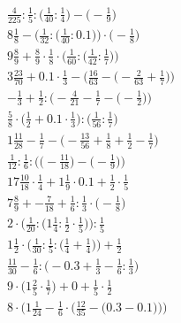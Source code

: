 \documentclass[8pt]{article}
\begin{document}
\begin{align}
\frac{4}{225} : \frac{1}{5} : \big(\frac{1}{40} : \frac{1}{4}\big) - \big(-\frac{1}{9}\big) \\
8\frac{1}{8} - \Big(\frac{1}{32} : \big(\frac{1}{40} : 0.1\big)\Big) \cdot \Big(-\frac{1}{8}\Big) \\
9\frac{8}{9} + \frac{8}{9} \cdot \frac{1}{8} \cdot \Big(\frac{1}{60} : \big(\frac{1}{42} : \frac{1}{7}\big)\Big) \\
3\frac{23}{70} + 0.1 \cdot \frac{1}{3} - \Big(\frac{16}{63} - \big(-\frac{2}{63} + \frac{1}{7}\big)\Big) \\
-\frac{1}{3} + \frac{1}{2} : \Big(-\frac{4}{21} - \frac{1}{7} - \big(-\frac{1}{2}\big)\Big) \\
\frac{5}{8} \cdot \big(\frac{1}{2} + 0.1 \cdot \frac{1}{3}\big) : \big(\frac{1}{56} : \frac{1}{7}\big) \\
1\frac{11}{28} - \frac{1}{7} - \big(-\frac{13}{56} + \frac{1}{8} + \frac{1}{2} - \frac{1}{7}\big) \\
\frac{1}{12} : \frac{1}{6} : \Big(\big(-\frac{11}{18}\big) - \big(-\frac{1}{9}\big)\Big) \\
17\frac{10}{18} \cdot \frac{1}{4} + 1\frac{1}{9} \cdot 0.1 + \frac{1}{2} \cdot \frac{1}{5} \\
7\frac{8}{9} + -\frac{7}{18} + \frac{1}{6} : \frac{1}{3} \cdot \big(-\frac{1}{8}\big) \\
2 \cdot \Big(\frac{1}{20} : \big(1\frac{1}{4} : \frac{1}{2} \cdot \frac{1}{5}\big)\Big) : \frac{1}{5} \\
1\frac{1}{2} \cdot \Big(\frac{1}{30} : \frac{1}{5} : \big(\frac{1}{4} + \frac{1}{4}\big)\Big) + \frac{1}{2} \\
\frac{11}{30} - \frac{1}{6} : \big(-0.3 + \frac{1}{3} - \frac{1}{6} : \frac{1}{3}\big) \\
9 \cdot \big(1\frac{2}{5} \cdot \frac{1}{7}\big) + 0 + \frac{1}{5} \cdot \frac{1}{2} \\
8 \cdot \bigg(1\frac{1}{24} - \frac{1}{6} \cdot \Big(\frac{12}{35} - \big(0.3 - 0.1\big)\Big)\bigg)
\end{align}
\end{document}

